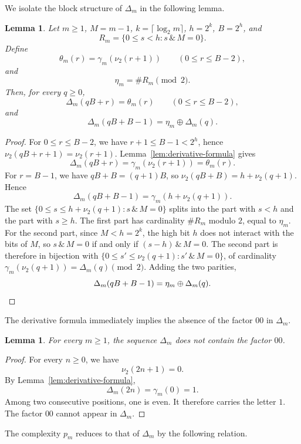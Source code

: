 \documentclass[12pt,reqno]{article}
\theoremstyle{plain}
\newtheorem{lemma}[theorem]{Lemma}
\theoremstyle{definition}
\begin{document}
We isolate the block structure of $\Delta_m$ in the following lemma.

\begin{lemma}
\label{lem:block-form-derivative}
Let $m \ge 1$, $M = m - 1$, $k = \lceil \log_2 m \rceil$, $h = 2^k$, $B = 2^h$, and
\[
  R_m = \{0 \le s < h : s \,\&\, M = 0\}.
\]
Define
\[
  \theta_m(r) = \gamma_m(\nu_2(r + 1)) \qquad (0 \le r \le B - 2),
\]
and
\[
  \eta_m = \#R_m \pmod 2.
\]
Then, for every $q \ge 0$,
\[
  \Delta_m(qB + r) = \theta_m(r) \qquad (0 \le r \le B - 2),
\]
and
\[
  \Delta_m(qB + B - 1) = \eta_m \oplus \Delta_m(q).
\]
\end{lemma}

\begin{proof}
For $0 \le r \le B - 2$, we have $r + 1 \le B - 1 < 2^h$, hence $\nu_2(qB + r + 1) = \nu_2(r + 1)$. Lemma~\ref{lem:derivative-formula} gives
\[
  \Delta_m(qB + r) = \gamma_m(\nu_2(r + 1)) = \theta_m(r).
\]
For $r = B - 1$, we have $qB + B = (q + 1) B$, so $\nu_2(qB + B) = h + \nu_2(q + 1)$. Hence
\[
  \Delta_m(qB + B - 1) = \gamma_m(h + \nu_2(q + 1)).
\]
The set $\{0 \le s \le h + \nu_2(q + 1) : s \,\&\, M = 0\}$ splits into the part with $s < h$ and the part with $s \ge h$. The first part has cardinality $\#R_m$ modulo $2$, equal to $\eta_m$. For the second part, since $M < h = 2^k$, the high bit $h$ does not interact with the bits of $M$, so $s \,\&\, M = 0$ if and only if $(s - h) \,\&\, M = 0$. The second part is therefore in bijection with $\{0 \le s' \le \nu_2(q + 1) : s' \,\&\, M = 0\}$, of cardinality $\gamma_m(\nu_2(q + 1)) = \Delta_m(q) \pmod 2$. Adding the two parities,
\[
  \Delta_m(qB + B - 1) = \eta_m \oplus \Delta_m(q). \qedhere
\]
\end{proof}

The derivative formula immediately implies the absence of the factor $00$ in $\Delta_m$.

\begin{lemma}
\label{lem:no-00}
For every $m \ge 1$, the sequence $\Delta_m$ does not contain the factor $00$.
\end{lemma}

\begin{proof}
For every $n \ge 0$, we have
\[
  \nu_2(2n + 1) = 0.
\]
By Lemma~\ref{lem:derivative-formula},
\[
  \Delta_m(2n) = \gamma_m(0) = 1.
\]
Among two consecutive positions, one is even. It therefore carries the letter $1$. The factor $00$ cannot appear in $\Delta_m$.
\end{proof}

The complexity $p_m$ reduces to that of $\Delta_m$ by the following relation.
\end{document}
